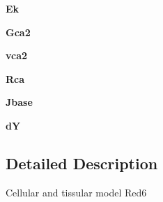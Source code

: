 \begin{DoxyCompactItemize}
\item 
\hypertarget{classcell__mdl2_1_1_red6_acbf7f480b7d4d43df681879f7cccbd77}{
{\bfseries Ek}}
\label{classcell__mdl2_1_1_red6_acbf7f480b7d4d43df681879f7cccbd77}

\item 
\hypertarget{classcell__mdl2_1_1_red6_a717bbb86c8afe169ebbf84b4f01998a8}{
{\bfseries Gca2}}
\label{classcell__mdl2_1_1_red6_a717bbb86c8afe169ebbf84b4f01998a8}

\item 
\hypertarget{classcell__mdl2_1_1_red6_aa783a2b833729df8570b0f66be441529}{
{\bfseries vca2}}
\label{classcell__mdl2_1_1_red6_aa783a2b833729df8570b0f66be441529}

\item 
\hypertarget{classcell__mdl2_1_1_red6_a99e0a0d42db1d5146e1db7d9def4d875}{
{\bfseries Rca}}
\label{classcell__mdl2_1_1_red6_a99e0a0d42db1d5146e1db7d9def4d875}

\item 
\hypertarget{classcell__mdl2_1_1_red6_a069197a6f80b4b40b374f98744011311}{
{\bfseries Jbase}}
\label{classcell__mdl2_1_1_red6_a069197a6f80b4b40b374f98744011311}

\item 
\hypertarget{classcell__mdl2_1_1_red6_a90011e7d69aec5376e286b72ae9e0730}{
{\bfseries dY}}
\label{classcell__mdl2_1_1_red6_a90011e7d69aec5376e286b72ae9e0730}

\end{DoxyCompactItemize}


\subsection{Detailed Description}
\begin{DoxyVerb}Cellular and tissular model Red6\end{DoxyVerb}
 

